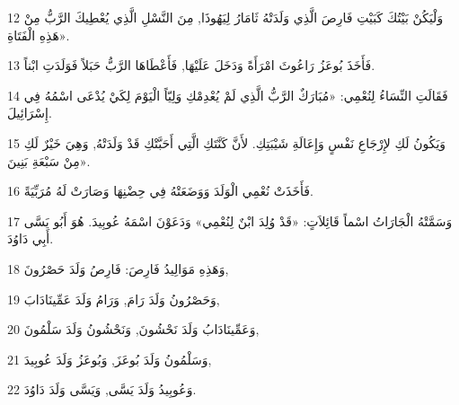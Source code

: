 \par 12 وَلْيَكُنْ بَيْتُكَ كَبَيْتِ فَارِصَ الَّذِي وَلَدَتْهُ ثَامَارُ لِيَهُوذَا, مِنَ النَّسْلِ الَّذِي يُعْطِيكَ الرَّبُّ مِنْ هَذِهِ الْفَتَاةِ».
\par 13 فَأَخَذَ بُوعَزُ رَاعُوثَ امْرَأَةً وَدَخَلَ عَلَيْهَا, فَأَعْطَاهَا الرَّبُّ حَبَلاً فَوَلَدَتِ ابْناً.
\par 14 فَقَالَتِ النِّسَاءُ لِنُعْمِي: «مُبَارَكٌ الرَّبُّ الَّذِي لَمْ يُعْدِمْكِ وَلِيّاً الْيَوْمَ لِكَيْ يُدْعَى اسْمُهُ فِي إِسْرَائِيلَ.
\par 15 وَيَكُونُ لَكِ لإِرْجَاعِ نَفْسٍ وَإِعَالَةِ شَيْبَتِكِ. لأَنَّ كَنَّتَكِ الَّتِي أَحَبَّتْكِ قَدْ وَلَدَتْهُ, وَهِيَ خَيْرٌ لَكِ مِنْ سَبْعَةِ بَنِينَ».
\par 16 فَأَخَذَتْ نُعْمِي الْوَلَدَ وَوَضَعَتْهُ فِي حِضْنِهَا وَصَارَتْ لَهُ مُرَبِّيَةً.
\par 17 وَسَمَّتْهُ الْجَارَاتُ اسْماً قَائِلاَتٍ: «قَدْ وُلِدَ ابْنٌ لِنُعْمِي» وَدَعَوْنَ اسْمَهُ عُوبِيدَ. هُوَ أَبُو يَسَّى أَبِي دَاوُدَ.
\par 18 وَهَذِهِ مَوَالِيدُ فَارِصَ: فَارِصُ وَلَدَ حَصْرُونَ,
\par 19 وَحَصْرُونُ وَلَدَ رَامَ, وَرَامُ وَلَدَ عَمِّينَادَابَ,
\par 20 وَعَمِّينَادَابُ وَلَدَ نَحْشُونَ, وَنَحْشُونُ وَلَدَ سَلْمُونَ,
\par 21 وَسَلْمُونُ وَلَدَ بُوعَزَ, وَبُوعَزُ وَلَدَ عُوبِيدَ,
\par 22 وَعُوبِيدُ وَلَدَ يَسَّى, وَيَسَّى وَلَدَ دَاوُدَ.

